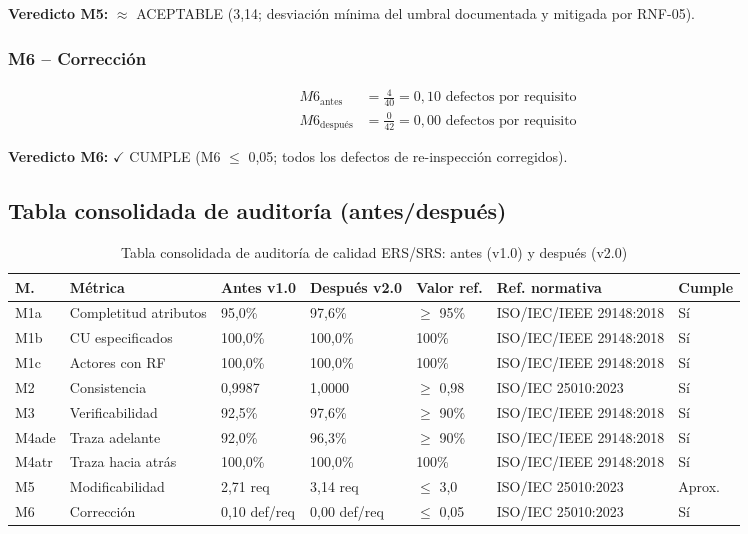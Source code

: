 \documentclass[11pt,a4paper]{article}
\begin{document}
\textbf{Veredicto M5:} $\approx$ ACEPTABLE (3,14; desviación mínima del umbral documentada y mitigada por RNF-05).

\subsubsection{M6 -- Corrección}

\begin{align*}
M6_{\text{antes}} &= \frac{4}{40} = 0{,}10 \text{ defectos por requisito} \\
M6_{\text{después}} &= \frac{0}{42} = 0{,}00 \text{ defectos por requisito}
\end{align*}

\textbf{Veredicto M6:} $\checkmark$ CUMPLE (M6 $\leq$ 0,05; todos los defectos de re-inspección corregidos).

\subsection{Tabla consolidada de auditoría (antes/después)}

\begin{longtable}{|p{1cm}|p{3cm}|p{1.8cm}|p{2cm}|p{2cm}|p{2.5cm}|p{1cm}|}
\caption{Tabla consolidada de auditoría de calidad ERS/SRS: antes (v1.0) y después (v2.0)}\\
\hline
\textbf{M.} & \textbf{Métrica} & \textbf{Antes v1.0} & \textbf{Después v2.0} & \textbf{Valor ref.} & \textbf{Ref. normativa} & \textbf{Cumple} \\
\hline
M1a & Completitud atributos & 95,0\% & 97,6\% & $\geq$ 95\% & ISO/IEC/IEEE 29148:2018 & Sí \\
\hline
M1b & CU especificados & 100,0\% & 100,0\% & 100\% & ISO/IEC/IEEE 29148:2018 & Sí \\
\hline
M1c & Actores con RF & 100,0\% & 100,0\% & 100\% & ISO/IEC/IEEE 29148:2018 & Sí \\
\hline
M2 & Consistencia & 0,9987 & 1,0000 & $\geq$ 0,98 & ISO/IEC 25010:2023 & Sí \\
\hline
M3 & Verificabilidad & 92,5\% & 97,6\% & $\geq$ 90\% & ISO/IEC/IEEE 29148:2018 & Sí \\
\hline
M4ade & Traza adelante & 92,0\% & 96,3\% & $\geq$ 90\% & ISO/IEC/IEEE 29148:2018 & Sí \\
\hline
M4atr & Traza hacia atrás & 100,0\% & 100,0\% & 100\% & ISO/IEC/IEEE 29148:2018 & Sí \\
\hline
M5 & Modificabilidad & 2,71 req & 3,14 req & $\leq$ 3,0 & ISO/IEC 25010:2023 & Aprox. \\
\hline
M6 & Corrección & 0,10 def/req & 0,00 def/req & $\leq$ 0,05 & ISO/IEC 25010:2023 & Sí \\
\hline
\end{longtable}
\end{document}
